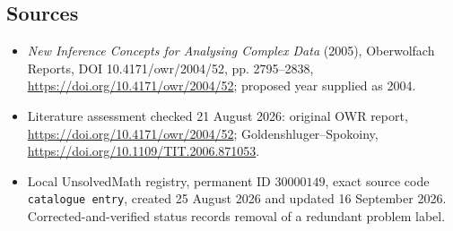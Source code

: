 \documentclass[11pt]{article}
\begin{document}
\subsection{Sources}
\begin{itemize}
\item \emph{New Inference Concepts for Analysing Complex Data} (2005), Oberwolfach Reports, DOI 10.4171/owr/2004/52, pp. 2795--2838, \url{https://doi.org/10.4171/owr/2004/52}; proposed year supplied as 2004.
\item Literature assessment checked 21 August 2026: original OWR report, \url{https://doi.org/10.4171/owr/2004/52}; Goldenshluger--Spokoiny, \url{https://doi.org/10.1109/TIT.2006.871053}.
\item Local UnsolvedMath registry, permanent ID $30000149$, exact source code \texttt{catalogue entry}, created 25 August 2026 and updated 16 September 2026. Corrected-and-verified status records removal of a redundant problem label.
\end{itemize}
\end{document}
